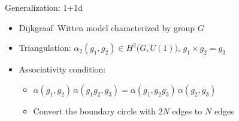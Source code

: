 \documentclass{fdubeamer}
\begin{document}
\begin{frame}{Generalization: 1+1d}

\begin{itemize}
  \item Dijkgraaf--Witten model characterized by group $G$
  \item Triangulation: $\alpha_2(g_1, g_2) \in H^2 \bigl(G, U(1)\bigr), \, g_1 \times g_2 = g_3$
  \item Associativity condition:

    \begin{itemize}
      \item $\alpha(g_1, g_2) \, \alpha(g_1 g_2, g_3) = \alpha(g_1, g_2 g_3) \, \alpha(g_2, g_3)$ \quad
        \begingroup
          \tikzset{x=0.6em, y=0.6em}
        \endgroup
      \item Convert the boundary circle with $2N$ edges to $N$ edges
    \end{itemize}
\end{itemize}

\begin{center}
  \scriptsize
  \tikzset{x=1em, y=1em, node font=\tiny}
\end{center}


\end{frame}
\end{document}
